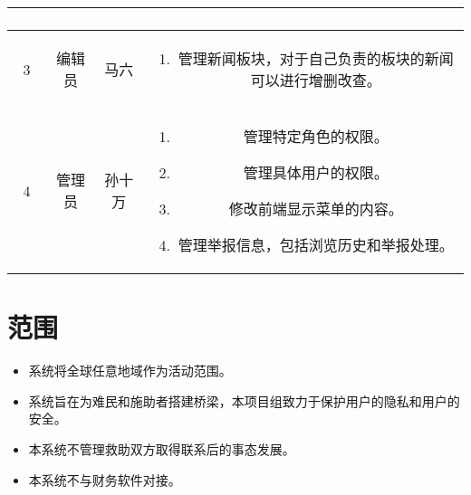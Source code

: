 \begin{table}[htbp]
\begin{tabular}{|c|c|c|c|}
\begin{minipage}[t]{0.4\textwidth}
\begin{enumerate}[nosep]
            \end{enumerate}
        \end{minipage}                                                                                                                                           \\
        \hline
        3                                & 编辑员                            & 马六                                 &
        \begin{minipage}[t]{0.4\textwidth}
            \begin{enumerate}[nosep]
                \item 管理新闻板块，对于自己负责的板块的新闻可以进行增删改查。
                      \vspace{0.5em}
            \end{enumerate}
        \end{minipage}                                                                                                                                           \\
        \hline
        4                                & 管理员                            & 孙十万                               &
        \begin{minipage}[t]{0.4\textwidth}
            \begin{enumerate}[nosep]
                \item 管理特定角色的权限。
                \item 管理具体用户的权限。
                \item 修改前端显示菜单的内容。
                \item 管理举报信息，包括浏览历史和举报处理。
                      \vspace{0.5em}
            \end{enumerate}
        \end{minipage}
        \\
        \hline
    \end{tabular}
\end{table}
\section{范围}
\begin{itemize}
    \item 系统将全球任意地域作为活动范围。
    \item 系统旨在为难民和施助者搭建桥梁，本项目组致力于保护用户的隐私和用户的安全。
    \item 本系统不管理救助双方取得联系后的事态发展。
    \item 本系统不与财务软件对接。
\end{itemize}